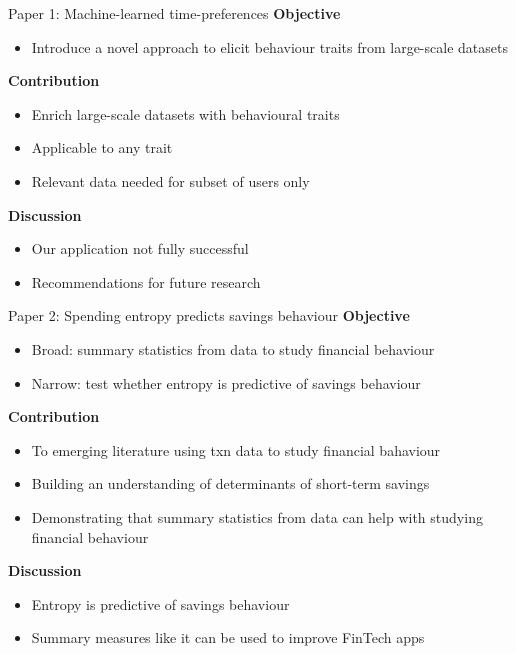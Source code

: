 \documentclass[xcolor=svgnames]{beamer}
\begin{document}
\begin{frame}{Paper 1: Machine-learned time-preferences}
    \textbf{Objective}
    \begin{itemize}
        \item Introduce a novel approach to elicit behaviour traits from large-scale datasets
    \end{itemize}
    \textbf{Contribution}
    \begin{itemize}
        \item Enrich large-scale datasets with behavioural traits
        \item Applicable to any trait
        \item Relevant data needed for subset of users only
    \end{itemize}
    \textbf{Discussion}
    \begin{itemize}
        \item Our application not fully successful
        \item Recommendations for future research
    \end{itemize}
\end{frame}

\begin{frame}{Paper 2: Spending entropy predicts savings behaviour}
    \textbf{Objective}
    \begin{itemize}
        \item Broad: summary statistics from data to study financial behaviour
        \item Narrow: test whether entropy is predictive of savings behaviour
    \end{itemize}
    \textbf{Contribution}
    \begin{itemize}
        \item To emerging literature using txn data to study financial bahaviour
        \item Building an understanding of determinants of short-term savings
        \item Demonstrating that summary statistics from data can help with studying financial behaviour
    \end{itemize}
    \textbf{Discussion}
    \begin{itemize}
        \item Entropy is predictive of savings behaviour
        \item Summary measures like it can be used to improve FinTech apps
    \end{itemize}
\end{frame}
\end{document}
